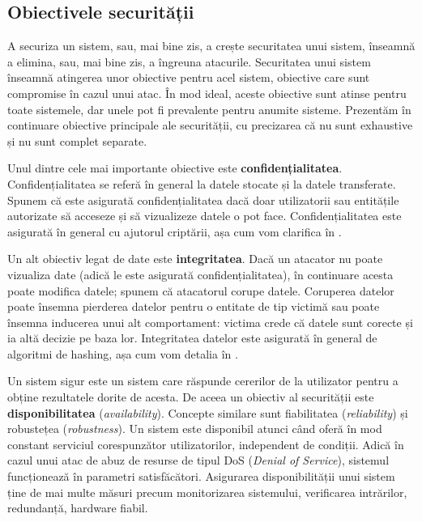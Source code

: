 \subsection{Obiectivele securității}
\label{sec:sec:fundamentals:objectives}

A securiza un sistem, sau, mai bine zis, a crește securitatea unui sistem, înseamnă a elimina, sau, mai bine zis, a îngreuna atacurile. Securitatea unui sistem înseamnă atingerea unor obiective pentru acel sistem, obiective care sunt compromise în cazul unui atac. În mod ideal, aceste obiective sunt atinse pentru toate sistemele, dar unele pot fi prevalente pentru anumite sisteme. Prezentăm în continuare obiective principale ale securității, cu precizarea că nu sunt exhaustive și nu sunt complet separate.

Unul dintre cele mai importante obiective este \textbf{confidențialitatea}. Confidențialitatea se referă în general la datele stocate și la datele transferate. Spunem că este asigurată confidențialitatea dacă doar utilizatorii sau entitățile autorizate să acceseze și să vizualizeze datele o pot face. Confidențialitatea este asigurată în general cu ajutorul criptării, așa cum vom clarifica în .

Un alt obiectiv legat de date este \textbf{integritatea}. Dacă un atacator nu poate vizualiza date (adică le este asigurată confidențialitatea), în continuare acesta poate modifica datele; spunem că atacatorul corupe datele. Coruperea datelor poate însemna pierderea datelor pentru o entitate de tip victimă sau poate însemna inducerea unui alt comportament: victima crede că datele sunt corecte și ia altă decizie pe baza lor. Integritatea datelor este asigurată în general de algoritmi de hashing, așa cum vom detalia în .

Un sistem sigur este un sistem care răspunde cererilor de la utilizator pentru a obține rezultatele dorite de acesta. De aceea un obiectiv al securității este \textbf{disponibilitatea} (\textit{availability}). Concepte similare sunt fiabilitatea (\textit{reliability}) și robustețea (\textit{robustness}). Un sistem este disponibil atunci când oferă în mod constant serviciul corespunzător utilizatorilor, independent de condiții. Adică în cazul unui atac de abuz de resurse de tipul DoS (\textit{Denial of Service}), sistemul funcționează în parametri satisfăcători. Asigurarea disponibilității unui sistem ține de mai multe măsuri precum monitorizarea sistemului, verificarea intrărilor, redundanță, hardware fiabil.

